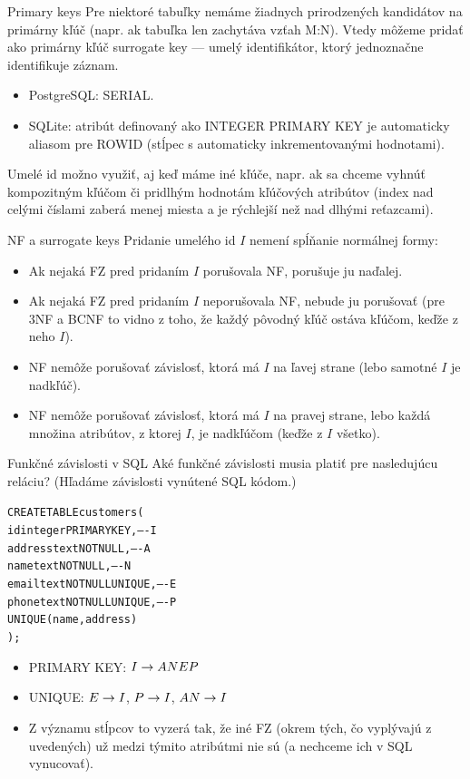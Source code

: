 \documentclass[12pt]{beamer}
\begin{document}
\begin{frame}[fragile]{Primary keys}
Pre niektoré tabuľky nemáme žiadnych prirodzených kandidátov na primárny kľúč
(napr. ak tabuľka len zachytáva vzťah M:N). Vtedy môžeme pridať ako primárny kľúč
\alert{surrogate key} --- umelý identifikátor, ktorý jednoznačne identifikuje záznam.

\begin{itemize}
\item PostgreSQL: SERIAL.
\item SQLite: atribút definovaný ako INTEGER PRIMARY KEY je automaticky aliasom pre ROWID
(stĺpec s automaticky inkrementovanými hodnotami).
\end{itemize}

Umelé id možno využiť, aj keď máme iné kľúče, napr. ak sa chceme vyhnúť kompozitným kľúčom
či pridlhým hodnotám kľúčových atribútov (index nad celými číslami zaberá menej miesta
a je rýchlejší než nad dlhými reťazcami).
\end{frame}

\begin{frame}[fragile]{NF a surrogate keys}
Pridanie umelého id $I$ nemení spĺňanie normálnej formy:
\begin{itemize}
\item Ak nejaká FZ pred pridaním $I$ porušovala NF, porušuje ju naďalej.
\item Ak nejaká FZ pred pridaním $I$ neporušovala NF, nebude ju porušovať
    (pre 3NF a BCNF to vidno z toho, že každý pôvodný kľúč ostáva kľúčom, keďže z neho  $I$).
\item NF nemôže porušovať závislosť, ktorá má $I$ na ľavej strane (lebo samotné $I$ je nadkľúč).
\item NF nemôže porušovať závislosť, ktorá má $I$ na pravej strane,
lebo každá množina atribútov, z ktorej  $I$, je nadkľúčom (keďže z $I$  všetko).
\end{itemize}
\end{frame}

\begin{frame}[fragile]{Funkčné závislosti v SQL}
Aké funkčné závislosti musia platiť pre nasledujúcu reláciu? (Hľadáme závislosti vynútené SQL kódom.)
\begin{alltt}
    CREATE TABLE customers (
        id        integer PRIMARY KEY,     ---- I
        address   text NOT NULL,           ---- A
        name      text NOT NULL,           ---- N
        email     text NOT NULL UNIQUE,    ---- E
        phone     text NOT NULL UNIQUE,    ---- P
        UNIQUE(name, address)
    );
\end{alltt}
\pause
\begin{itemize}
\item PRIMARY KEY: $I\rightarrow ANEP$
\item UNIQUE: $E\rightarrow I$, $P\rightarrow I$, $AN\rightarrow I$
\item Z významu stĺpcov to vyzerá tak, že iné FZ (okrem tých, čo vyplývajú z uvedených) už medzi týmito atribútmi nie sú (a nechceme ich v SQL vynucovať).
\end{itemize}
\end{frame}
\end{document}
